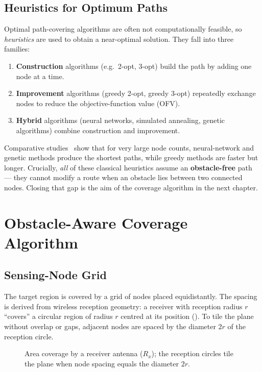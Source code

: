 \section{Heuristics for Optimum Paths}
Optimal path-covering algorithms are often not computationally feasible, so
\emph{heuristics} are used to obtain a near-optimal solution. They fall into
three families:
\begin{enumerate}
  \item \textbf{Construction} algorithms (e.g.\ 2-opt, 3-opt) build the path by
        adding one node at a time.
  \item \textbf{Improvement} algorithms (greedy 2-opt, greedy 3-opt) repeatedly
        exchange nodes to reduce the objective-function value (OFV).
  \item \textbf{Hybrid} algorithms (neural networks, simulated annealing, genetic
        algorithms) combine construction and improvement.
\end{enumerate}
Comparative studies~\cite{tsp_compare,youtube_tsp} show that for very large node
counts, neural-network and genetic methods produce the shortest paths, while
greedy methods are faster but longer. Crucially, \emph{all} of these classical
heuristics assume an \textbf{obstacle-free} path --- they cannot modify a route
when an obstacle lies between two connected nodes. Closing that gap is the aim of
the coverage algorithm in the next chapter.

\chapter{Obstacle-Aware Coverage Algorithm}
\label{ch:algo}

\section{Sensing-Node Grid}
The target region is covered by a grid of nodes placed equidistantly. The spacing
is derived from wireless reception geometry: a receiver with reception radius
$r$ ``covers'' a circular region of radius $r$ centred at its position
(). To tile the plane without overlap or gaps, adjacent nodes are
spaced by the diameter $2r$ of the reception circle.

\begin{figure}[H]
\centering
{}
\caption{Area coverage by a receiver antenna ($R_x$); the reception circles tile
the plane when node spacing equals the diameter $2r$.}
\label{fig:rx}
\end{figure}

